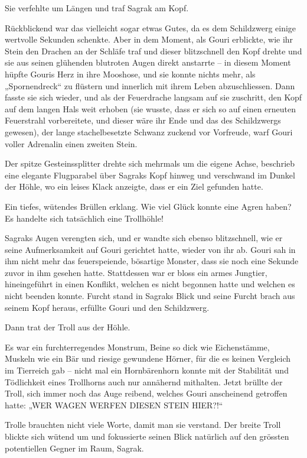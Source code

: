 Sie verfehlte um Längen und traf Sagrak am Kopf.

Rückblickend war das vielleicht sogar etwas Gutes, da es dem Schildzwerg einige wertvolle Sekunden schenkte. Aber in dem Moment, als Gouri erblickte, wie ihr Stein den Drachen an der Schläfe traf und dieser blitzschnell den Kopf drehte und sie aus seinen glühenden blutroten Augen direkt anstarrte – in diesem Moment hüpfte Gouris Herz in ihre Mooshose, und sie konnte nichts mehr, als „Spornendreck“ zu flüstern und innerlich mit ihrem Leben abzuschliessen. Dann fasste sie sich wieder, und als der Feuerdrache langsam auf sie zuschritt, den Kopf auf dem langen Hals weit erhoben (sie wusste, dass er sich so auf einen erneuten Feuerstrahl vorbereitete, und dieser wäre ihr Ende und das des Schildzwergs gewesen), der lange stachelbesetzte Schwanz zuckend vor Vorfreude, warf Gouri voller Adrenalin einen zweiten Stein.

Der spitze Gesteinssplitter drehte sich mehrmals um die eigene Achse, beschrieb eine elegante Flugparabel über Sagraks Kopf hinweg und verschwand im Dunkel der Höhle, wo ein leises Klack anzeigte, dass er ein Ziel gefunden hatte.

Ein tiefes, wütendes Brüllen erklang. Wie viel Glück konnte eine Agren haben? Es handelte sich tatsächlich eine Trollhöhle!

Sagraks Augen verengten sich, und er wandte sich ebenso blitzschnell, wie er seine Aufmerksamkeit auf Gouri gerichtet hatte, wieder von ihr ab. Gouri sah in ihm nicht mehr das feuerspeiende, bösartige Monster, dass sie noch eine Sekunde zuvor in ihm gesehen hatte. Stattdessen war er bloss ein armes Jungtier, hineingeführt in einen Konflikt, welchen es nicht begonnen hatte und welchen es nicht beenden konnte. Furcht stand in Sagraks Blick und seine Furcht brach aus seinem Kopf heraus, erfüllte Gouri und den Schildzwerg.

Dann trat der Troll aus der Höhle.

Es war ein furchterregendes Monstrum, Beine so dick wie Eichenstämme, Muskeln wie ein Bär und riesige gewundene Hörner, für die es keinen Vergleich im Tierreich gab – nicht mal ein Hornbärenhorn konnte mit der Stabilität und Tödlichkeit eines Trollhorns auch nur annähernd mithalten. Jetzt brüllte der Troll, sich immer noch das Auge reibend, welches Gouri anscheinend getroffen hatte: „WER WAGEN WERFEN DIESEN STEIN HIER?!“

Trolle brauchten nicht viele Worte, damit man sie verstand. Der breite Troll blickte sich wütend um und fokussierte seinen Blick natürlich auf den grössten potentiellen Gegner im Raum, Sagrak.

